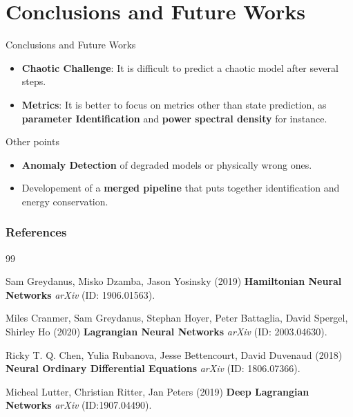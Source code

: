 \section{Conclusions and Future Works}

\begin{frame}{Conclusions and Future Works}
    \begin{itemize}
        \item \textbf{Chaotic Challenge}: It is difficult to predict a chaotic model after several steps.
        \item \textbf{Metrics}: It is better to focus on metrics other than state prediction, as \textbf{parameter Identification} and \textbf{power spectral density} for instance.
    \end{itemize}
    \begin{block}{Other points}
        \begin{itemize}
            \item \textbf{Anomaly Detection} of degraded models or physically wrong ones.
            \item Developement of a \textbf{merged pipeline} that puts together identification and energy conservation.
        \end{itemize}
    \end{block}
\end{frame}

\begin{frame} %
	\frametitle{References}
	
	\begin{thebibliography}{99} 
    \footnotesize 

        Sam Greydanus, Misko Dzamba, Jason Yosinsky (2019)
        \newblock \textbf{Hamiltonian Neural Networks}
        \newblock \emph{arXiv} (ID: 1906.01563).
        
   
        Miles Cranmer, Sam Greydanus, Stephan Hoyer, Peter Battaglia, David Spergel, Shirley Ho (2020)
        \newblock \textbf{Lagrangian Neural Networks} 
        \newblock \emph{arXiv} (ID: 2003.04630).
    

        Ricky T. Q. Chen, Yulia Rubanova, Jesse Bettencourt, David Duvenaud (2018)
        \newblock \textbf{Neural Ordinary Differential Equations}
        \newblock \emph{arXiv} (ID: 1806.07366).

        Micheal Lutter, Christian Ritter, Jan Peters (2019)
        \newblock \textbf{Deep Lagrangian Networks}
        \newblock \emph{arXiv} (ID:1907.04490).
\end{thebibliography}

\end{frame}
